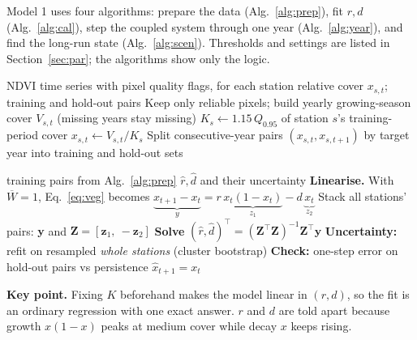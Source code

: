 \documentclass[11pt,a4paper]{article}
\newcommand{\Wb}{\overline W}
\begin{document}
Model 1 uses four algorithms: prepare the data (Alg.~\ref{alg:prep}), fit $r,d$ (Alg.~\ref{alg:cal}),
step the coupled system through one year (Alg.~\ref{alg:year}), and find the long-run state (Alg.~\ref{alg:scen}).
Thresholds and settings are listed in Section~\ref{sec:par}; the algorithms show only the logic.

\begin{algorithm}[H]
\caption{Data preparation}\label{alg:prep}
\begin{algorithmic}[1]
\Require NDVI time series with pixel quality flags, for each station
\Ensure relative cover $x_{s,t}$; training and hold-out pairs
\State Keep only reliable pixels; build yearly growing-season cover $V_{s,t}$ (missing years stay missing)
\State $K_s\gets1.15\,Q_{0.95}$ of station $s$'s training-period cover 
\State $x_{s,t}\gets V_{s,t}/K_s$
\State Split consecutive-year pairs $(x_{s,t},x_{s,t+1})$ by target year into training and hold-out sets
\end{algorithmic}
\end{algorithm}

\begin{algorithm}[H]
\caption{Calibration of $r,d$: pooled linear least squares}\label{alg:cal}
\begin{algorithmic}[1]
\Require training pairs from Alg.~\ref{alg:prep}
\Ensure $\hat r,\hat d$ and their uncertainty
\State \textbf{Linearise.} With $\Wb=1$, Eq.~\eqref{eq:veg} becomes
$\underbrace{x_{t+1}-x_t}_{y}=r\,\underbrace{x_t(1-x_t)}_{z_1}-d\,\underbrace{x_t}_{z_2}$
\State Stack all stations' pairs: $\bm y$ and $\bm Z=[\bm z_1,\ -\bm z_2]$
\State \textbf{Solve} $(\hat r,\hat d)^\top=(\bm Z^\top\bm Z)^{-1}\bm Z^\top\bm y$ 
\State \textbf{Uncertainty:} refit on resampled \emph{whole stations} (cluster bootstrap)
\State \textbf{Check:} one-step error on hold-out pairs vs persistence $\hat x_{t+1}=x_t$
\end{algorithmic}
\end{algorithm}
\noindent\textbf{Key point.} Fixing $K$ beforehand makes the model linear in $(r,d)$, so the fit is an ordinary
regression with one exact answer. $r$ and $d$ are told apart because growth $x(1-x)$ peaks at medium cover
while decay $x$ keeps rising.
\end{document}
